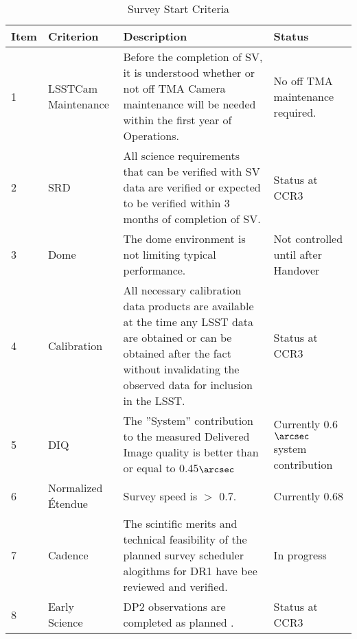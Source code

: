 \begin{table}[]
\renewcommand{\arraystretch}{2}
\small
\centering
\caption{Survey Start Criteria}\label{tab:criteria}
\begin{tabular}{|p{0.25in}|p{1in}|p{4in}|p{1.0in}|}
\hline
Item & Criterion & Description& Status \\
\hline \hline

1 & \makecell[l]{LSSTCam\\ Maintenance} & Before the completion of SV, it is understood whether or not off TMA Camera maintenance will be needed within the first year of Operations.& No off TMA maintenance required.  \\\hline  

2 & SRD &All science requirements that can be verified with SV data are verified or expected to be verified within 3 months of completion of SV. & Status at CCR3 \\\hline

3 & Dome & The dome environment is not limiting typical performance. &\makecell[l]{ Not controlled \\until after \\Handover} \\\hline

4 & Calibration & All necessary calibration data products are available at the time any LSST data are obtained or can be obtained after the fact without invalidating the observed data for inclusion in the LSST. & Status at CCR3 \\\hline

5& DIQ& The ''System'' contribution to the measured Delivered Image quality is better than or equal to 0.45$\arcsec$ & \makecell[l]{Currently 0.6$\arcsec$ \\system \\contribution}\\\hline

6 & Normalized \'{E}tendue & Survey speed  is $>$ 0.7. & Currently 0.68 \\\hline

7 & Cadence & The scintific merits and technical feasibility of the planned survey scheduler alogithms for DR1 have bee reviewed and verified.& In progress\\\hline

8 & Early Science&DP2 observations are completed as planned \citep{RTN-011}.& Status at CCR3 \\

\hline
\end{tabular}
\end{table}

